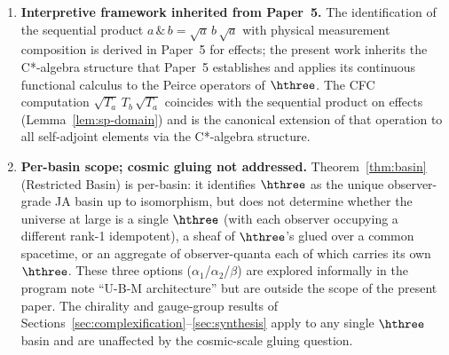 \begin{enumerate}
    (Gap~SA) is deferred to future work.
  \item \textbf{Interpretive framework inherited from Paper~5.}  The
    identification of the sequential product
    $a\,\&\,b = \sqrt{a}\,b\,\sqrt{a}$ with physical measurement
    composition is derived in Paper~5 for effects; the present work
    inherits the C*-algebra structure that Paper~5 establishes and
    applies its continuous functional calculus to the Peirce operators
    of $\hthree$.  The CFC computation
    $\sqrt{T_a}\,T_b\,\sqrt{T_a}$ coincides with the sequential
    product on effects (Lemma~\ref{lem:sp-domain}) and is the
    canonical extension of that operation to all self-adjoint
    elements via the C*-algebra structure.
  \item \textbf{Per-basin scope; cosmic gluing not addressed.}
    Theorem~\ref{thm:basin} (Restricted Basin) is per-basin: it
    identifies $\hthree$ as the unique observer-grade JA basin up to
    isomorphism, but does not determine whether the universe at
    large is a single $\hthree$ (with each observer occupying a
    different rank-1 idempotent), a sheaf of $\hthree$'s glued over
    a common spacetime, or an aggregate of observer-quanta each of
    which carries its own $\hthree$.  These three options
    ($\alpha_1$/$\alpha_2$/$\beta$) are explored informally in the
    program note ``U-B-M architecture'' but are outside the scope
    of the present paper.  The chirality and gauge-group results
    of Sections~\ref{sec:complexification}--\ref{sec:synthesis}
    apply to any single $\hthree$ basin and are unaffected by the
    cosmic-scale gluing question.
\end{enumerate}
